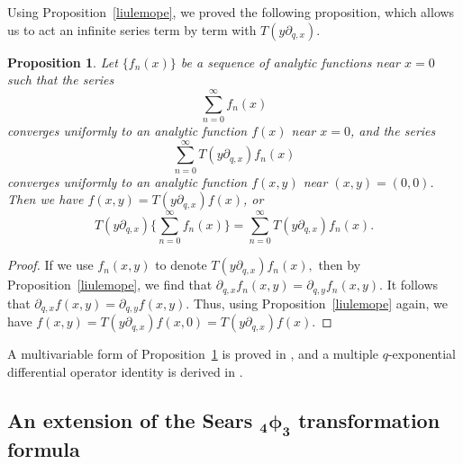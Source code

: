 \documentclass[10pt,a4paper]{amsart}
\numberwithin{equation}{section}
\newtheorem{Proposition}[Theorem]{Proposition}
 { \theoremstyle{definition}
\newtheorem{Definition}[Theorem]{Definition}
\newtheorem{Note}[Theorem]{Note}
\newtheorem{Example}[Theorem]{Example}
\newtheorem{Remark}[Theorem]{Remark} }
\begin{document}
Using Proposition~\ref{liulemope}, we \cite[Proposition~13.9]{LiuRam2013} proved the following proposition, which allows us to act an infinite series term by term with $T(y\partial_{q, x})$.
\begin{Proposition} \label{liuopeppf}Let $\{f_n(x)\}$ be a sequence of analytic functions near $x=0$
	such that the series
	\[
	\sum_{n=0}^\infty f_n(x)
	\]
	converges uniformly to an analytic function $f(x)$ near $x=0$, and the series
	\[
	\sum_{n=0}^\infty T(y\partial_{q, x})f_n(x)
	\]
	converges uniformly to an analytic function $f(x, y)$ near $(x, y)=(0, 0)$. Then we have
	$f(x, y)=T(y\partial_{q, x})f(x)$, or
	\[
	T(y\partial_{q, x})\Biggl\{\sum_{n=0}^\infty f_n(x)\Biggr\}=\sum_{n=0}^\infty T(y\partial_{q, x})f_n(x).
	\]
\end{Proposition}
\begin{proof} If we use $f_n(x, y)$ to denote $T(y\partial_{q, x})f_n(x), $ then by Proposition~\ref{liulemope}, we find that $\partial_{q, x}f_n(x, y)=\partial_{q, y}f_n(x, y)$. It follows that
	$\partial_{q, x}f(x, y)=\partial_{q, y}f(x, y)$. Thus, using Proposition~\ref{liulemope} again,
	we have
	$
	f(x, y)=T(y\partial_{q, x})f(x, 0)=T(y\partial_{q, x})f(x).
	$
\end{proof}

A multivariable form of Proposition~\ref{liuopeppf} is proved in \cite{Liu2023Acta}, and a multiple $q$-exponential differential
operator identity is derived in \cite{Liu2023ActaSci}.

\subsection[An extension of the Sears \_4phi\_3 transformation formula]{An extension of the Sears $\boldsymbol{_4\phi_3}$ transformation formula}
\end{document}
